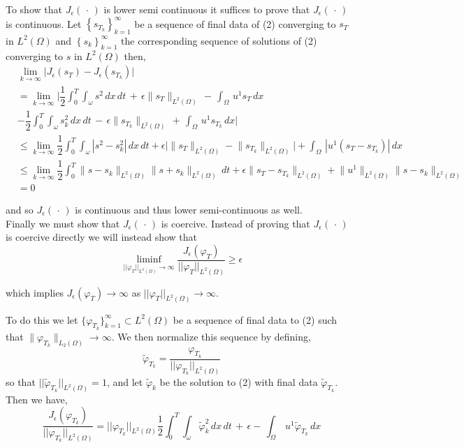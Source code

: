 \documentclass[11pt]{article}
\begin{document}
To show that $J_\epsilon (\,\cdot\,)$ is lower semi continuous it suffices to prove that $J_\epsilon (\,\cdot\,)$ is continuous. Let $\left\{s_{T_k}\right\}_{k=1}^{\infty}$ be a sequence of final data of (2) converging to $s_T$ in $L^2(\Omega)$ and  $\left\{s_k\right\}_{k=1}^{\infty}$ the corresponding sequence of solutions of (2) converging to $s$ in $L^2(\Omega)$ then,
\begin{equation*}
\begin{aligned}
& \lim_{k \rightarrow \infty} \biggr| J_\epsilon(s_T)-J_\epsilon(s_{T_k})\biggr|
\\
&=\lim_{k \rightarrow \infty} \biggr|\dfrac{1}{2}\int_{0}^{T}\int_\omega s^2\,dx\,dt\, +\,\epsilon\lVert s_T \rVert_{L^2(\Omega)}\, -\,\int_\Omega\,u^1 s_T\,dx\\
&-\dfrac{1}{2}\int_{0}^{T}\int_\omega s_k^2\,dx\,dt\, -\,\epsilon\lVert s_{T_k} \rVert_{L^2(\Omega)}\, +\,\int_\Omega\,u^1 s_{T_k}\,dx \biggr|
\\
&\leq \lim_{k \rightarrow \infty} \dfrac{1}{2}\int_{0}^{T}\int_\omega |s^2-s_k^2|\,dx\,dt+ \epsilon\biggr| \lVert s_T \rVert_{L^2(\Omega)}-\lVert s_{T_k} \rVert_{L^2(\Omega)} \biggr| + \int_\Omega\,|u^1(s_T -s_{T_k})|\,dx
\\
&\leq \lim_{k \rightarrow \infty} \dfrac{1}{2}\int_{0}^{T} \lVert s-s_k \rVert_{L^2(\Omega)}\lVert s+s_k \rVert_{L^2(\Omega)}\,dt +\epsilon\lVert s_T-s_{T_k} \rVert_{L^2(\Omega)}+ \lVert u^1 \rVert_{L^2(\Omega)}\lVert s-s_k \rVert_{L^2(\Omega)}\\
&=0
\end{aligned}
\end{equation*} 

and so $J_\epsilon (\,\cdot\,)$ is continuous and thus lower semi-continuous as well.\\
 Finally we must show that $J_\epsilon (\,\cdot\,)$ is coercive. Instead of proving that $J_\epsilon (\,\cdot\,)$ is coercive directly we will instead show that
$$\liminf_{\lvert\lvert\varphi_T\rvert\rvert_{L^2(\Omega)} \to\infty}\dfrac{J_\epsilon (\varphi_T)}{\lvert\lvert\varphi_T\rvert\rvert_{L^2(\Omega)}} \geq \epsilon$$

which implies $J_\epsilon (\varphi_T) \rightarrow \infty$ as $\lvert\lvert\varphi_T\rvert\rvert_{L^2(\Omega)} \rightarrow \infty$.

To do this we let  $\{\varphi_{T_k}\}_{k=1}^{\infty} \subset L^2(\Omega)$ be a sequence of final data to (2) such that $\lVert \varphi_{T_k} \rVert_{L_{2}(\Omega)} \rightarrow \infty$. We then normalize this sequence by defining,
$$\widetilde{\varphi}_{T_k} = \dfrac{\varphi_{T_k}}{\lvert\lvert\varphi_{T_k}\rvert\rvert_{L^2(\Omega)}}$$
so that $\lvert\lvert\widetilde{\varphi}_{T_k}\rvert\rvert_{L^2(\Omega)} =1$, and let $\widetilde{\varphi}_k$ be the solution to (2) with final data $\widetilde{\varphi}_{T_k}$. Then we have,
$$\dfrac{J_\epsilon(\varphi_{T_k})}{\lvert\lvert\varphi_{T_k}\rvert\rvert_{L^2(\Omega)}} = \lvert\lvert\varphi_{T_k}\rvert\rvert_{L^2(\Omega)}\dfrac{1}{2}\int_{0}^{T}\int_\omega\widetilde{\varphi}_k^2\,dx\,dt\, +\,\epsilon-\,\int_\Omega\,u^1\widetilde{\varphi}_{T_k}\,dx$$
\end{document}
